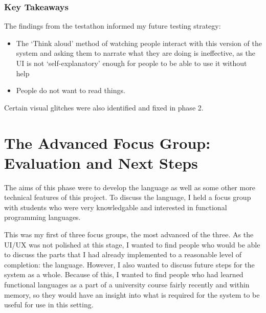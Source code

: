 

\subsubsection{Key Takeaways} The findings from the testathon informed my future testing strategy:
\begin{itemize}
    \item The `Think aloud' method of watching people interact with this version of the system and asking them to narrate what they are doing is ineffective, as the UI is not `self-explanatory' enough for people to be able to use it without help 
    \item People do not want to read things. 
\end{itemize}

Certain visual glitches were also identified and fixed in phase 2. 

\section{The Advanced Focus Group: Evaluation and Next Steps}
\label{ref:afg_figma}
\label{ref:afg}
The aims of this phase were to develop the language as well as some other more technical features of this project. To discuss the language, I held a focus group with students who were very knowledgable and interested in functional programming languages. 

This was my first of three focus groups, the most advanced of the three. As the UI/UX was not polished at this stage, I wanted to find people who would be able to discuss the parts that I had already implemented to a reasonable level of completion: the language. However, I also wanted to discuss future steps for the system as a whole. Because of this, I wanted to find people who had learned functional languages as a part of a university course fairly recently and within memory, so they would have an insight into what is required for the system to be useful for use in this setting. 

